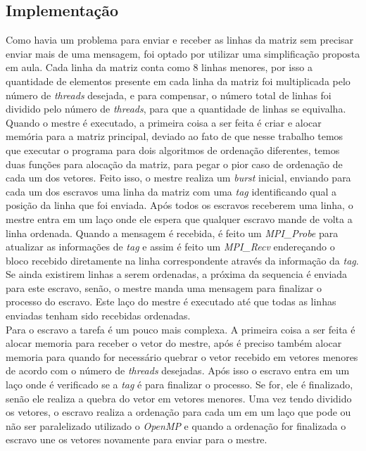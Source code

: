 \documentclass[12pt]{article}
\begin{document}
{\begin{multicols}{2}
\section{Implementação}
Como havia um problema para enviar e receber as linhas da matriz sem precisar enviar mais de uma mensagem, foi optado por utilizar uma simplificação proposta em aula. Cada linha da matriz conta como 8 linhas menores, por isso a quantidade de elementos presente em cada linha da matriz foi multiplicada pelo número de \textit{threads} desejada, e para compensar, o número total de linhas foi dividido pelo número de \textit{threads}, para que a quantidade de linhas se equivalha. \\
Quando o mestre é executado, a primeira coisa a ser feita é criar e alocar memória para a matriz principal, deviado ao fato de que nesse trabalho temos que executar o programa para dois algoritmos de ordenação diferentes, temos duas funções para alocação da matriz, para pegar o pior caso de ordenação de cada um dos vetores. Feito isso, o mestre realiza um \textit{burst} inicial, enviando para cada um dos escravos uma linha da matriz com uma \textit{tag} identificando qual a posição da linha que foi enviada. Após todos os escravos receberem uma linha, o mestre entra em um laço onde ele espera que qualquer escravo mande de volta a linha ordenada. Quando a mensagem é recebida, é feito um \textit{MPI\_Probe} para atualizar as informações de \textit{tag} e assim é feito um \textit{MPI\_Recv} endereçando o bloco recebido diretamente na linha correspondente através da informação da \textit{tag}. Se ainda existirem linhas a serem ordenadas, a próxima da sequencia é enviada para este escravo, senão, o mestre manda uma mensagem para finalizar o processo do escravo. Este laço do mestre é executado até que todas as linhas enviadas tenham sido recebidas ordenadas.\\
Para o escravo a tarefa é um pouco mais complexa. A primeira coisa a ser feita é alocar memoria para receber o vetor do mestre, após é preciso também alocar memoria para quando for necessário quebrar o vetor recebido em vetores menores de acordo com o número de \textit{threads} desejadas. Após isso o escravo entra em um laço onde é verificado se a \textit{tag} é para finalizar o processo. Se for, ele é finalizado, senão ele realiza a quebra do vetor em vetores menores. Uma vez tendo dividido os vetores, o escravo realiza a ordenação para cada um em um laço que pode ou não ser paralelizado utilizado o \textit{OpenMP} e quando a ordenação for finalizada o escravo une os vetores novamente para enviar para o mestre. 


\end{multicols}}
\end{document}
